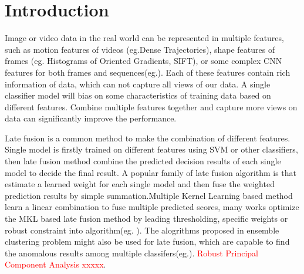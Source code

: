 \documentclass[letterpaper]{article}
\def\yanred{\textcolor{red}}
\begin{document}
\section{Introduction}

Image or video data in the real world can be represented in multiple features, such as motion features of videos (eg.Dense Trajectories\cite{Wang2011Action}), shape features of frames (eg. Histograms of Oriented Gradients\cite{dalal2005histograms}, SIFT\cite{lowe2004distinctive}), or some complex CNN features for both frames and sequences(eg.\cite{szegedy2015going,chatfield2014return,he2015deep,simonyan2014two,Xu_2015_CVPR}).
Each of these features contain rich information of data, which can not capture all views of our data. A single classifier model will bias on some characteristics of training data based on different features. Combine multiple features together and capture more views on data can significantly improve the performance.


Late fusion is a common method to make the combination of different features. Single model is firstly trained on different features using SVM or other classifiers, then late fusion method combine the predicted decision results of each single model to decide the final result.
A popular family of late fusion algorithm is that estimate a learned weight for each single model and then fuse the weighted prediction results by simple summation.Multiple Kernel Learning\cite{Rakotomamonjy2008Simplemkl} based method learn a linear combination to fuse multiple predicted scores, many works optimize the MKL based late fusion method by leading thresholding, specific weights or robust constraint into algorithm(eg. \cite{gehler2009feature,xuiccv2013feature,lai2015learning}). 
The alogrithms proposed in ensemble clustering problem might also be used for late fusion, which are capable to find the anomalous results among multiple classifers(eg.\cite{gaoijcai2016robust}).
\yanred{Robust Principal Component Analysis xxxxx}. 
\end{document}
